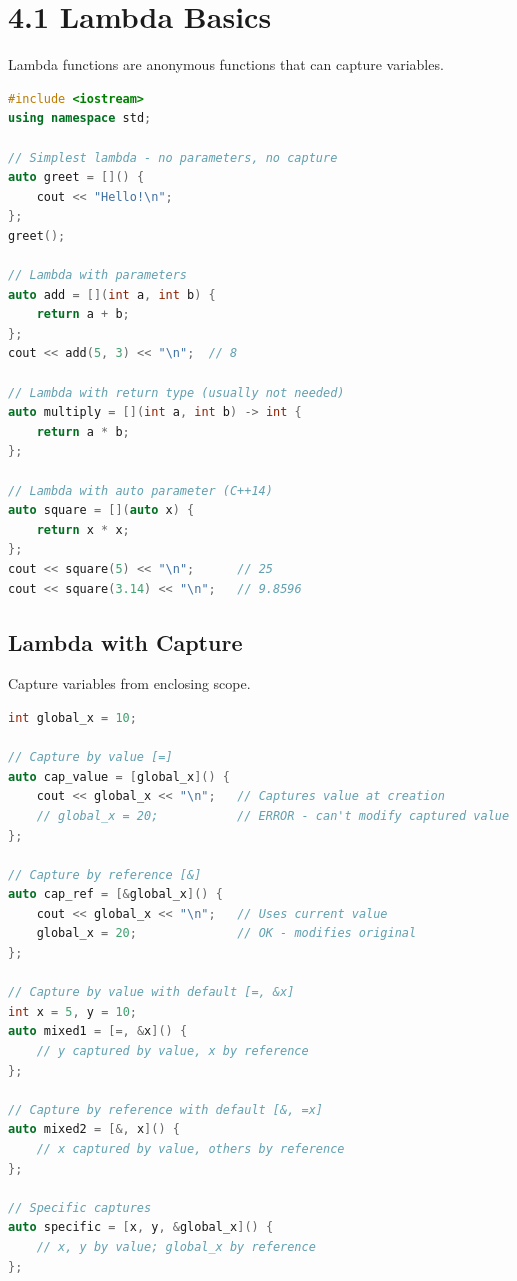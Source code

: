\hypertarget{lambda-basics}{%
\section{4.1 Lambda Basics}\label{lambda-basics}}

Lambda functions are anonymous functions that can capture variables.

\begin{lstlisting}[language={C++}]
#include <iostream>
using namespace std;

// Simplest lambda - no parameters, no capture
auto greet = []() {
    cout << "Hello!\n";
};
greet();

// Lambda with parameters
auto add = [](int a, int b) {
    return a + b;
};
cout << add(5, 3) << "\n";  // 8

// Lambda with return type (usually not needed)
auto multiply = [](int a, int b) -> int {
    return a * b;
};

// Lambda with auto parameter (C++14)
auto square = [](auto x) {
    return x * x;
};
cout << square(5) << "\n";      // 25
cout << square(3.14) << "\n";   // 9.8596
\end{lstlisting}

\hypertarget{lambda-with-capture}{%
\subsection{Lambda with Capture}\label{lambda-with-capture}}

Capture variables from enclosing scope.

\begin{lstlisting}[language={C++}]
int global_x = 10;

// Capture by value [=]
auto cap_value = [global_x]() {
    cout << global_x << "\n";   // Captures value at creation
    // global_x = 20;           // ERROR - can't modify captured value
};

// Capture by reference [&]
auto cap_ref = [&global_x]() {
    cout << global_x << "\n";   // Uses current value
    global_x = 20;              // OK - modifies original
};

// Capture by value with default [=, &x]
int x = 5, y = 10;
auto mixed1 = [=, &x]() {
    // y captured by value, x by reference
};

// Capture by reference with default [&, =x]
auto mixed2 = [&, x]() {
    // x captured by value, others by reference
};

// Specific captures
auto specific = [x, y, &global_x]() {
    // x, y by value; global_x by reference
};
\end{lstlisting}


